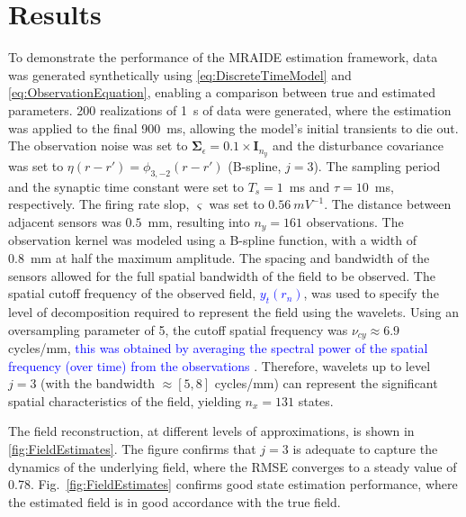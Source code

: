 \documentclass[journal]{IEEEtran}
\newcommand{\dean}[1]{\textcolor{green}{#1}}
\newcommand{\parham}[1]{\textcolor{blue}{#1}}
\newcommand{\ken}[1]{\textsf{\emph{\textbf{\textcolor{magenta}{#1}}}}}
\newcommand{\cut}[1]{\textcolor{cyan}{#1}}
\begin{document}
\section{Results}
To demonstrate the performance of the MRAIDE estimation framework, data was generated synthetically  using \eqref{eq:DiscreteTimeModel} and \eqref{eq:ObservationEquation}, enabling a comparison between true and estimated parameters. 200 realizations of 1~s of data were generated, where the estimation was applied to the final 900~ms, allowing the model's initial transients to die out. The observation noise was set to $\boldsymbol\Sigma_{\epsilon}=0.1 \times \mathbf{I}_{n_y}$ and the disturbance covariance was set to $\eta(r-r') = \phi_{3,-2}(r-r')$ (B-spline, $j=3$). The sampling period and the synaptic time constant were set to $T_s = 1$~ms and $\tau = 10$~ms, respectively. The firing rate slop, $\varsigma$ was set to $0.56~mV^{-1}$. The distance between adjacent sensors was $0.5$~mm, resulting into $n_y = 161$ observations. The observation kernel was modeled using a B-spline function, with a width of 0.8~mm at half the maximum amplitude. The spacing and bandwidth of the sensors allowed for the full spatial bandwidth of the field to be observed.  %
The spatial cutoff frequency of the observed field, \parham{$y_t(r_n)$}, was used to specify the level of decomposition required to represent the field using the wavelets. Using an oversampling parameter of 5, the cutoff spatial frequency was $\nu_{cy} \approx 6.9 $ cycles/mm, \parham{this was obtained by averaging the spectral power of the spatial frequency (over time) from the observations} \cite{Scerri2009}. Therefore, wavelets up to level $j=3$ (with the bandwidth $\approx[5,8]$ cycles/mm) can represent the significant spatial characteristics of the field, yielding $n_x = 131$ states. 


The field reconstruction, at different levels of approximations, is shown in \figurename{\ref{fig:FieldEstimates}}. The figure confirms that $j=3$ is adequate to capture the dynamics of the underlying field, where the RMSE converges to a steady value of 0.78. Fig.~\ref{fig:FieldEstimates} confirms good state estimation performance, where the estimated field is in good accordance with the true field. 
\end{document}

